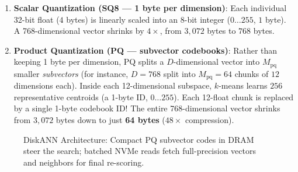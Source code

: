 \begin{enumerate}[leftmargin=18pt]
  \item \textbf{Scalar Quantization (SQ8 --- 1 byte per dimension)}: Each individual 32-bit float ($4$ bytes) is linearly scaled into an 8-bit integer ($0\dots 255$, $1$ byte). A 768-dimensional vector shrinks by $4\times$, from $3{,}072$ bytes to $768$ bytes.
  \item \textbf{Product Quantization (PQ --- subvector codebooks)}: Rather than keeping 1 byte per dimension, PQ splits a $D$-dimensional vector into $M_{\text{pq}}$ smaller \emph{subvectors} (for instance, $D = 768$ split into $M_{\text{pq}} = 64$ chunks of $12$ dimensions each). Inside each 12-dimensional subspace, $k$-means learns $256$ representative centroids (a 1-byte ID, $0\dots 255$). Each 12-float chunk is replaced by a single 1-byte codebook ID! The entire 768-dimensional vector shrinks from $3{,}072$ bytes down to just \textbf{64 bytes} ($48\times$ compression).
\end{enumerate}

\begin{figure}[htbp]
\centering
{}
\caption{DiskANN Architecture: Compact PQ subvector codes in DRAM steer the search; batched NVMe reads fetch full-precision vectors and neighbors for final re-scoring.}
\label{fig:v2-ch01-diskann}
\end{figure}

